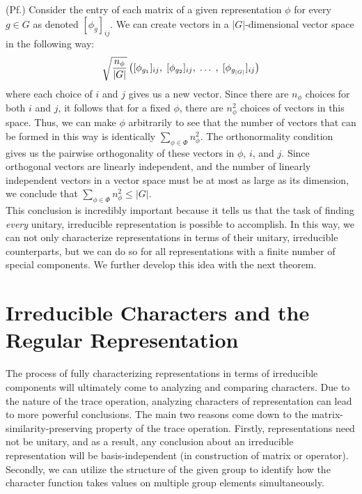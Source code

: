 \documentclass[10pt]{ucthesis}
\begin{document}
\noindent (Pf.) Consider the entry of each matrix of a given representation $\phi$ for every $g \in G$ as denoted $[\phi_g]_{ij}$. We can create vectors in a $|G|$-dimensional vector space in the following way:
$$\sqrt{\frac{n_\phi}{|G|}}\left([\phi_{g_1}]_{ij},\hspace{1mm} [\phi_{g_2}]_{ij}, \hspace{1mm}\hdots \hspace{1mm},\hspace{1mm} [\phi_{g_{|G|}}]_{ij}\right)$$
where each choice of $i$ and $j$ gives us a new vector. Since there are $n_\phi$ choices for both $i$ and $j$, it follows that for a fixed $\phi$, there are $n_\phi^2$ choices of vectors in this space. Thus, we can make $\phi$ arbitrarily to see that the number of vectors that can be formed in this way is identically $\sum_{\phi \in \Phi}n^2_\phi$. The orthonormality condition gives us the pairwise orthogonality of these vectors in $\phi$, $i$, and $j$. Since orthogonal vectors are linearly independent, and the number of linearly independent vectors in a vector space must be at most as large as its dimension, we conclude that $\sum_{\phi \in \Phi}n^2_\phi \leq |G|$. \cite{Tung} \qedsymbol\\


This conclusion is incredibly important because it tells us that the task of finding \textit{every} unitary, irreducible representation is possible to accomplish. In this way, we can not only characterize representations in terms of their unitary, irreducible counterparts, but we can do so for all representations with a finite number of special components. We further develop this idea with the next theorem.


\section{Irreducible Characters and the Regular Representation}

The process of fully characterizing representations in terms of irreducible components will ultimately come to analyzing and comparing characters. Due to the nature of the trace operation, analyzing characters of representation can lead to more powerful conclusions. The main two reasons come down to the matrix-similarity-preserving property of the trace operation. Firstly, representations need not be unitary, and as a result, any conclusion about an irreducible representation will be basis-independent (in construction of matrix or operator). Secondly, we can utilize the structure of the given group to identify how the character function takes values on multiple group elements simultaneously. 
\end{document}
